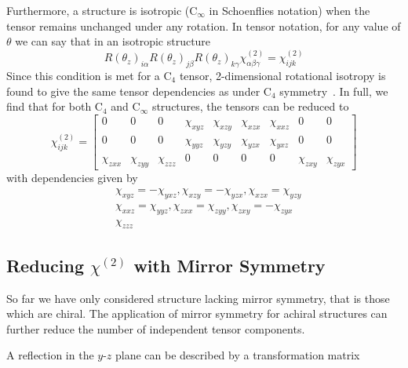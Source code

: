 Furthermore, a structure is isotropic (C$_{\infty}$ in Schoenflies notation) when the tensor remains unchanged under any rotation. In tensor notation, for any value of $\theta$ we can say that in an isotropic structure
\begin{equation}\label{eq:background:NonlinearOptics:rotation:RotIsoTensor}
	R(\theta_{z})_{i\alpha}R(\theta_{z})_{j\beta}R(\theta_{z})_{k\gamma}\chi^{(2)}_{\alpha \beta \gamma}
	=\chi^{(2)}_{ijk}
\end{equation}
Since this condition is met for a  C$_4$ tensor, 2-dimensional rotational isotropy is found to give the same tensor dependencies as under C$_4$ symmetry~\cite[\S E.1.8]{Popov1995}. In full, we find that for both C$_4$ and C$_{\infty}$ structures, the tensors can be reduced to
\begin{equation}\label{eq:background:NonlinearOptics:rotation:IsotropicChi}
	\chi^{(2)}_{ijk} =
	\begin{bmatrix}
		0 & 0 & 0 & \chi_{xyz} & \chi_{xzy} & \chi_{xzx} & \chi_{xxz} & 0 & 0\\ 
		0 & 0 & 0 & \chi_{yyz} & \chi_{yzy} & \chi_{yzx} & \chi_{yxz} & 0 & 0\\ 
		\chi_{zxx} & \chi_{zyy} & \chi_{zzz} & 0 & 0 & 0 & 0 & \chi_{zxy} & \chi_{zyx}
	\end{bmatrix}
\end{equation}
with dependencies given by
\begin{equation}\label{eq:background:NonlinearOptics:rotation:IsotropicDependancies}
\begin{split}
	&\chi_{xyz} = -\chi_{yxz}, \chi_{xzy} = -\chi_{yzx}, \chi_{xzx} = \chi_{yzy} \\
	&\chi_{xxz} = \chi_{yyz}, \chi_{zxx} = \chi_{zyy}, \chi_{zxy} = -\chi_{zyx} \\
	&\chi_{zzz}
\end{split}
\end{equation}



\subsection{Reducing \texorpdfstring{$\chi^{(2)}$}{Lg} with Mirror Symmetry}\label{sec:background:NonlinearOptics:mirror}
So far we have only considered structure lacking mirror symmetry, that is those which are chiral. The application of mirror symmetry for achiral structures can further reduce the number of independent tensor components.

A reflection in the $y$-$z$ plane can be described by a transformation matrix

